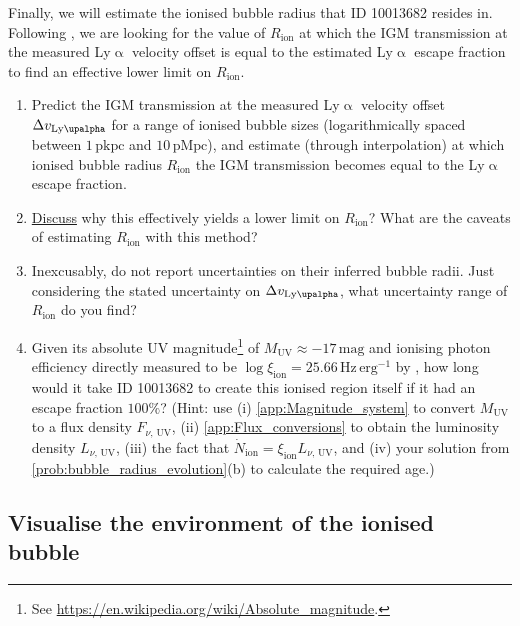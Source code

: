 \documentclass{article}
\newcommand{\Lya}{{Ly\ensuremath{\upalpha}}\xspace}
\theoremstyle{definition}
\begin{document}
Finally, we will estimate the ionised bubble radius that ID 10013682 resides in. Following \citet{2024A&A...682A..40W}, we are looking for the value of $R_\text{ion}$ at which the IGM transmission at the measured \Lya velocity offset is equal to the estimated \Lya escape fraction to find an effective lower limit on $R_\text{ion}$.
\begin{enumerate}[label=(\alph*)]
    \item Predict the IGM transmission at the measured \Lya velocity offset $\Delta v_\text{\Lya}$ for a range of ionised bubble sizes (logarithmically spaced between $1 \, \mathrm{pkpc}$ and $10 \, \mathrm{pMpc}$), and estimate (through interpolation) at which ionised bubble radius $R_\text{ion}$ the IGM transmission becomes equal to the \Lya escape fraction.
    \item \underline{Discuss} why this effectively yields a lower limit on $R_\text{ion}$? What are the caveats of estimating $R_\text{ion}$ with this method?
    \item Inexcusably, \citet{2024A&A...682A..40W} do not report uncertainties on their inferred bubble radii. Just considering the stated uncertainty on $\Delta v_\text{\Lya}$, what uncertainty range of $R_\text{ion}$ do you find?
    \item Given its absolute UV magnitude\footnote{See \url{https://en.wikipedia.org/wiki/Absolute_magnitude}.} of $M_\text{UV} \approx -17 \, \mathrm{mag}$ and ionising photon efficiency directly measured to be $\log \xi_\text{ion} = 25.66 \, \mathrm{Hz \, erg^{-1}}$ by \citet{2024A&A...684A..84S}, how long would it take ID 10013682 to create this ionised region itself if it had an escape fraction $100\%$? (Hint: use (i) \cref{app:Magnitude_system} to convert $M_\text{UV}$ to a flux density $F_{\nu, \, \text{UV}}$, (ii) \cref{app:Flux_conversions} to obtain the luminosity density $L_{\nu, \, \text{UV}}$, (iii) the fact that $\dot{N}_\text{ion} = \xi_\text{ion} L_{\nu, \, \text{UV}}$, and (iv) your solution from \cref{prob:bubble_radius_evolution}(b) to calculate the required age.)
\end{enumerate}

\subsection{Visualise the environment of the ionised bubble}
\end{document}
